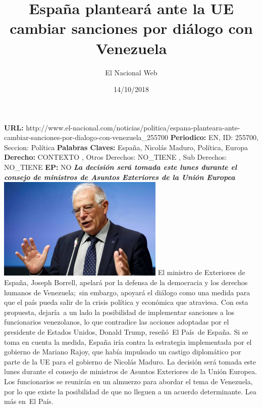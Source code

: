 \documentclass{article}%
\title{\textbf{España planteará ante la UE cambiar sanciones por diálogo con Venezuela}}%
\author{El Nacional Web}%
\date{14/10/2018}%
\begin{document}
%
\normalsize%
\maketitle%
\textbf{URL: }%
http://www.el{-}nacional.com/noticias/politica/espana{-}planteara{-}ante{-}cambiar{-}sanciones{-}por{-}dialogo{-}con{-}venezuela\_255700\newline%
%
\textbf{Periodico: }%
EN, %
ID: %
255700, %
Seccion: %
Política\newline%
%
\textbf{Palabras Claves: }%
España, Nicolás Maduro, Política, Europa\newline%
%
\textbf{Derecho: }%
CONTEXTO%
, Otros Derechos: %
NO\_TIENE%
, Sub Derechos: %
NO\_TIENE%
\newline%
%
\textbf{EP: }%
NO\newline%
\newline%
%
\textbf{\textit{La decisión será tomada este lunes durante el consejo de ministros de Asuntos Exteriores de la Unión Europea}}%
\newline%
\newline%
%
\includegraphics[width=300px]{107.jpg}%
\newline%
%
El ministro de Exteriores de España, Joseph Borrell, apelará por la defensa de la democracia y los derechos humanos de Venezuela;~sin embargo, apoyará el diálogo como una medida para que el país pueda salir de la crisis política y económica que atraviesa.%
\newline%
%
Con esta propuesta, dejaría~a un lado la posibilidad de implementar sanciones a los funcionarios venezolanos, lo que contradice las acciones adoptadas por el presidente de Estados Unidos, Donald Trump, reseñó~El País~de España.%
\newline%
%
Si se toma en cuenta la medida, España iría contra la estrategia implementada por el gobierno de Mariano Rajoy, que había impulsado un castigo diplomático por parte de la UE para el gobierno de Nicolás Maduro.%
\newline%
%
La decisión será tomada este lunes durante el consejo de ministros de Asuntos Exteriores de la Unión Europea. Los funcionarios se reunirán en un almuerzo para abordar el tema de Venezuela, por lo que existe la posibilidad de que no lleguen a un acuerdo determinante.%
\newline%
%
Lea más en~El País.%
\newline%
%
\end{document}

